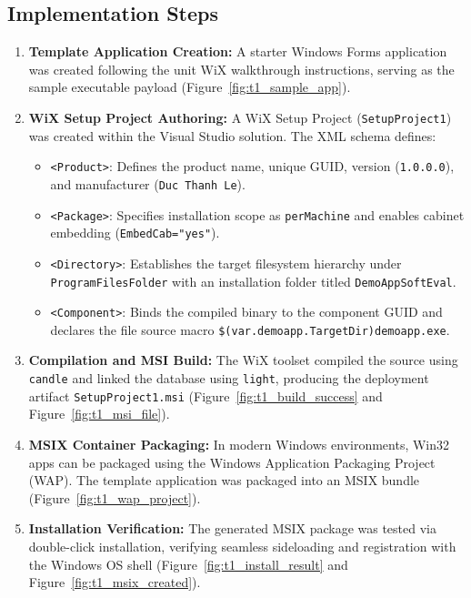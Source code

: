 \documentclass[11pt,a4paper]{article}
\begin{document}
\subsection{Implementation Steps}
\begin{enumerate}[leftmargin=1.2cm]
    \item \textbf{Template Application Creation:} A starter Windows Forms application was created following the unit WiX walkthrough instructions, serving as the sample executable payload (Figure~\ref{fig:t1_sample_app}).
    \item \textbf{WiX Setup Project Authoring:} A WiX Setup Project (\texttt{SetupProject1}) was created within the Visual Studio solution. The XML schema defines:
    \begin{itemize}
        \item \texttt{<Product>}: Defines the product name, unique GUID, version (\texttt{1.0.0.0}), and manufacturer (\texttt{Duc Thanh Le}).
        \item \texttt{<Package>}: Specifies installation scope as \texttt{perMachine} and enables cabinet embedding (\texttt{EmbedCab="yes"}).
        \item \texttt{<Directory>}: Establishes the target filesystem hierarchy under \texttt{ProgramFilesFolder} with an installation folder titled \texttt{DemoAppSoftEval}.
        \item \texttt{<Component>}: Binds the compiled binary to the component GUID and declares the file source macro \texttt{\$(var.demoapp.TargetDir)demoapp.exe}.
    \end{itemize}
    \item \textbf{Compilation and MSI Build:} The WiX toolset compiled the source using \texttt{candle} and linked the database using \texttt{light}, producing the deployment artifact \texttt{SetupProject1.msi} (Figure~\ref{fig:t1_build_success} and Figure~\ref{fig:t1_msi_file}).
    \item \textbf{MSIX Container Packaging:} In modern Windows environments, Win32 apps can be packaged using the Windows Application Packaging Project (WAP). The template application was packaged into an MSIX bundle (Figure~\ref{fig:t1_wap_project}).
    \item \textbf{Installation Verification:} The generated MSIX package was tested via double-click installation, verifying seamless sideloading and registration with the Windows OS shell (Figure~\ref{fig:t1_install_result} and Figure~\ref{fig:t1_msix_created}).
\end{enumerate}
\end{document}
